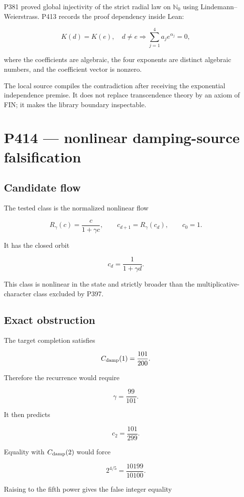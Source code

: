 \documentclass[11pt,a4paper,openany]{report}
\begin{document}
P381 proved global injectivity of the strict radial law on \(\mathbb N_0\) using Lindemann--Weierstrass. P413 records the proof dependency inside Lean:

\[
K(d)=K(e),\quad d\ne e
\Longrightarrow
\sum_{j=1}^{4}a_j e^{\alpha_j}=0,
\]

where the coefficients are algebraic, the four exponents are distinct algebraic numbers, and the coefficient vector is nonzero.

The local source compiles the contradiction after receiving the exponential independence premise. It does not replace transcendence theory by an axiom of FIN; it makes the library boundary inspectable.

\chapter{P414 --- nonlinear damping-source falsification}

\section{Candidate flow}

The tested class is the normalized nonlinear flow

\[
R_\gamma(c)=\frac{c}{1+\gamma c},
\qquad c_{d+1}=R_\gamma(c_d),
\qquad c_0=1.
\]

It has the closed orbit

\[
c_d=\frac{1}{1+\gamma d}.
\]

This class is nonlinear in the state and strictly broader than the multiplicative-character class excluded by P397.

\section{Exact obstruction}

The target completion satisfies

\[
C_{\rm damp}(1)=\frac{101}{200}.
\]

Therefore the recurrence would require

\[
\gamma=\frac{99}{101}.
\]

It then predicts

\[
c_2=\frac{101}{299}.
\]

Equality with \(C_{\rm damp}(2)\) would force

\[
2^{4/5}=\frac{10199}{10100}.
\]

Raising to the fifth power gives the false integer equality
\end{document}
